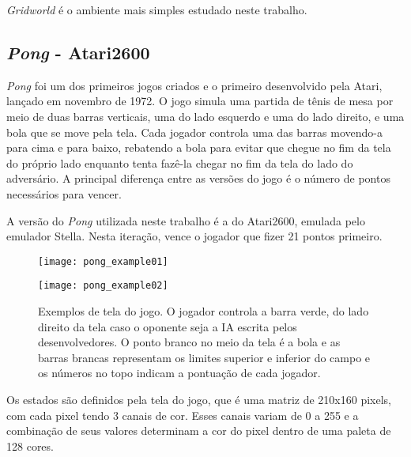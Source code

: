 \textit{Gridworld} é o ambiente mais simples estudado neste trabalho.

\subsection{\textit{Pong} - Atari2600}
\label{sec:pong}

\textit{Pong} foi um dos primeiros jogos criados e o primeiro desenvolvido pela Atari, lançado em novembro de 1972.
O jogo simula uma partida de tênis de mesa por meio de duas barras verticais, uma do lado esquerdo e uma do lado direito, e uma bola que se move pela tela.
Cada jogador controla uma das barras movendo-a para cima e para baixo, rebatendo a bola para evitar que chegue no fim da tela do próprio lado enquanto tenta fazê-la chegar no fim da tela do lado do adversário.
A principal diferença entre as versões do jogo é o número de pontos necessários para vencer.

A versão do \textit{Pong} utilizada neste trabalho é a do Atari2600, emulada pelo emulador Stella.
Nesta iteração, vence o jogador que fizer 21 pontos primeiro.

\begin{figure}[h!]
  \begin{minipage}[b]{.5\textwidth}
  \centering
  \texttt{[image: pong\_example01]}
  \end{minipage}
  \hfill
  \begin{minipage}[b]{.5\textwidth}
  \texttt{[image: pong\_example02]}
  \end{minipage}
  \caption{Exemplos de tela do jogo. O jogador controla a barra verde, do lado direito da tela caso o oponente seja a IA escrita pelos desenvolvedores. O ponto branco no meio da tela é a bola e as barras brancas representam os limites superior e inferior do campo e os números no topo indicam a pontuação de cada jogador.}
\end{figure}

Os estados são definidos pela tela do jogo, que é uma matriz de 210x160 pixels, com cada pixel tendo 3 canais de cor.
Esses canais variam de 0 a 255 e a combinação de seus valores determinam a cor do pixel dentro de uma paleta de 128 cores.

